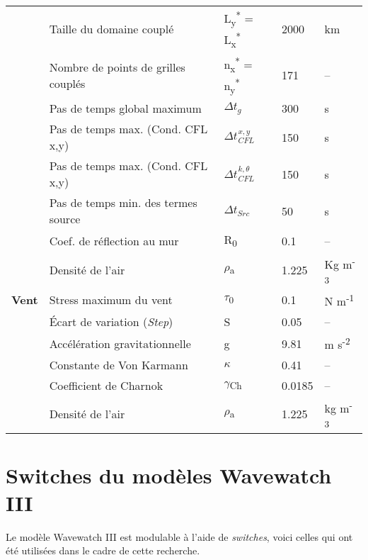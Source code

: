 \documentclass[10pt]{report}
\numberwithin{equation}{section}
\newcommand{\pt}{\hspace{1pt}} %
\begin{document}
\begin{center}
\begin{tabular}{lllll}
 & Taille du domaine couplé & L\textsubscript{y}\textsuperscript{*} = L\textsubscript{x}\textsuperscript{*} & 2000 & km\\[0pt]
 & Nombre de points de grilles couplés & n\textsubscript{x}\textsuperscript{*} = n\textsubscript{y}\textsuperscript{*} & 171 & --\\[0pt]
 & Pas de temps global maximum & \(\Delta t_g\) & 300 & s\\[0pt]
 & Pas de temps max. (Cond. CFL x,y) & \(\Delta t_{\pt CFL}^{\pt x,y}\) & 150 & s\\[0pt]
 & Pas de temps max. (Cond. CFL x,y) & \(\Delta t_{\pt CFL}^{\pt k,\theta}\) & 150 & s\\[0pt]
 & Pas de temps min. des termes source & \(\Delta t_{Src}\) & 50 & s\\[0pt]
 & Coef. de réflection au mur & R\textsubscript{0} & 0.1 & --\\[0pt]
 & Densité de l'air & \(\rho\)\textsubscript{a} & 1.225 & Kg m\textsuperscript{-3}\\[0pt]
\hline
\textbf{Vent} & Stress maximum du vent & \(\tau\)\textsubscript{0} & 0.1 & N m\textsuperscript{-1}\\[0pt]
 & Écart de variation (\emph{Step}) & S & 0.05 & --\\[0pt]
 & Accélération gravitationnelle & g & 9.81 & m s\textsuperscript{-2}\\[0pt]
 & Constante de Von Karmann & \(\kappa\) & 0.41 & --\\[0pt]
 & Coefficient de Charnok & \(\gamma\)\textsubscript{Ch} & 0.0185 & --\\[0pt]
 & Densité de l'air & \(\rho\)\textsubscript{a} & 1.225 & kg m\textsuperscript{-3}\\[0pt]
\hline
\end{tabular}
\end{center}




\section{Switches du modèles Wavewatch III}
\label{sec:orga02c9c4}

Le modèle Wavewatch III est modulable à l'aide de \emph{switches}, voici celles qui ont été utilisées dans le cadre de cette recherche. 
\end{document}
